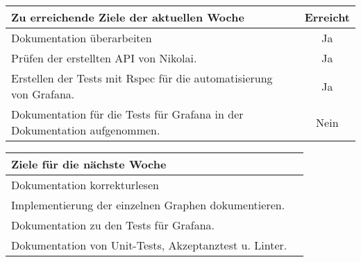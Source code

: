 \begin{tabularx}{\textwidth}{Xc}
    \arrayrulecolor{OliveGreen}
    \toprule
    {\bfseries Zu erreichende Ziele der aktuellen Woche} & {\bfseries Erreicht} \\
    \midrule[2pt]
    Dokumentation überarbeiten                              &Ja              \\
    \rowcolor{OliveGreen!15}
    Prüfen der erstellten API von Nikolai.                   &Ja              \\
    \rowcolor{White}
    Erstellen der Tests mit Rspec für die automatisierung von Grafana.  &Ja   \\
    \rowcolor{OliveGreen!15}
    Dokumentation für die Tests für Grafana in der Dokumentation
    aufgenommen.                &Nein              \\
   \bottomrule[2pt]
\end{tabularx}
%
\vspace{1cm}
%
\begin{tabularx}{\textwidth}{Xc}
    \arrayrulecolor{OliveGreen}
    \toprule
    {\bfseries Ziele für die nächste Woche}        &                         \\
    \midrule[2pt]
    Dokumentation korrekturlesen                 &                         \\
    \rowcolor{OliveGreen!15}
    Implementierung der einzelnen Graphen dokumentieren.   &                  \\
    \rowcolor{White}
    Dokumentation zu den Tests für Grafana.         &                         \\
    \rowcolor{OliveGreen!15}
    Dokumentation von Unit-Tests, Akzeptanztest u. Linter. &                  \\
\end{tabularx}

